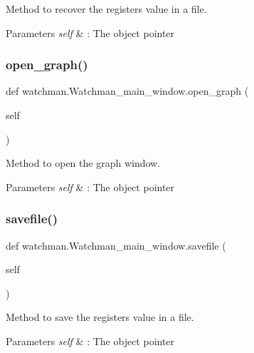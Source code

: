 Method to recover the register\textquotesingle{}s value in a file. 


\begin{DoxyParams}{Parameters}
{\em self} & \+: The object pointer \\
\hline
\end{DoxyParams}
\mbox{\label{classwatchman_1_1_watchman__main__window_a99d6e254c6da829ebe7b2798806af3bf}} 
\subsubsection{open\_graph()}
{\footnotesize\ttfamily def watchman.\+Watchman\+\_\+main\+\_\+window.\+open\+\_\+graph (\begin{DoxyParamCaption}\item[{}]{self }\end{DoxyParamCaption})}



Method to open the graph window. 


\begin{DoxyParams}{Parameters}
{\em self} & \+: The object pointer \\
\hline
\end{DoxyParams}
\mbox{\label{classwatchman_1_1_watchman__main__window_a5f2f0684e828492369f1e11c50192dc3}} 
\subsubsection{savefile()}
{\footnotesize\ttfamily def watchman.\+Watchman\+\_\+main\+\_\+window.\+savefile (\begin{DoxyParamCaption}\item[{}]{self }\end{DoxyParamCaption})}



Method to save the register\textquotesingle{}s value in a file. 


\begin{DoxyParams}{Parameters}
{\em self} & \+: The object pointer \\
\hline
\end{DoxyParams}
\mbox{\label{classwatchman_1_1_watchman__main__window_a90ee7e25dde8f15c709b9a9c8fd4dbde}} 
